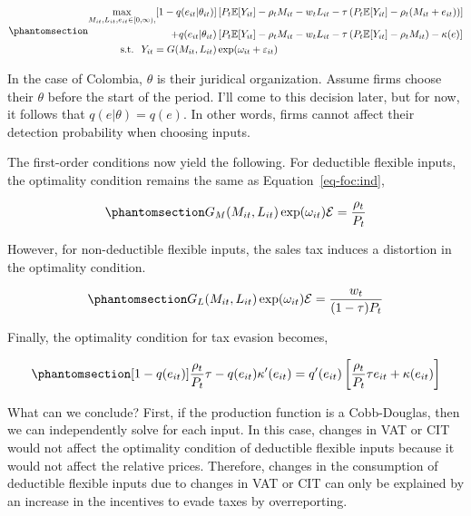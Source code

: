 \documentclass[
  12pt]{article}
\theoremstyle{definition}
\theoremstyle{remark}
\begin{document}
\begin{equation}\phantomsection\label{eq-eva-non-deduct}{
\begin{aligned}
  \max_{M_{it}, L_{it},e_{it}\in [0,\infty), } [1-q(e_{it}|\theta_{it})]&\left[P_t\mathbb{E}[Y_{it}]-\rho_{t} M_{it}-w_{t} L_{it}-\tau\left(P_t\mathbb{E}[Y_{it}]-\rho_{t} (M_{it}+e_{it})\right)\right]\\
  +q(e_{it}|\theta_{it})&\left[P_t\mathbb{E}[Y_{it}]-\rho_{t} M_{it}-w_{t} L_{it}-\tau\left(P_t\mathbb{E}[Y_{it}]-\rho_{t} M_{it}\right)-\kappa(e)\right] \\
  \text{s.t. }\; Y_{it}=G(M_{it},L_{it})&\exp(\omega_{it}+\varepsilon_{it})
\end{aligned}
}\end{equation}

In the case of Colombia, \(\theta\) is their juridical organization.
Assume firms choose their \(\theta\) before the start of the period.
I'll come to this decision later, but for now, it follows that
\(q(e|\theta)=q(e)\). In other words, firms cannot affect their
detection probability when choosing inputs.

The first-order conditions now yield the following. For deductible
flexible inputs, the optimality condition remains the same as
Equation~\ref{eq-foc:ind},

\begin{equation}\phantomsection\label{eq-foc:deduct}{
G_M(M_{it}, L_{it})\exp(\omega_{it})\mathcal{E}=\frac{\rho_{t}}{P_t}
}\end{equation}

However, for non-deductible flexible inputs, the sales tax induces a
distortion in the optimality condition.

\begin{equation}\phantomsection\label{eq-foc:non-deduct}{
G_L(M_{it}, L_{it})\exp(\omega_{it})\mathcal{E}=\frac{w_{t}}{(1-\tau)P_t}
}\end{equation}

Finally, the optimality condition for tax evasion becomes,

\begin{equation}\phantomsection\label{eq-foc-cont-e}{
[1-q(e_{it})]\frac{\rho_t}{P_t}\tau-q(e_{it})\kappa'(e_{it})=q'(e_{it})\left[\frac{\rho_t}{P_t}\tau e_{it} + \kappa(e_{it})\right]
}\end{equation}

What can we conclude? First, if the production function is a
Cobb-Douglas, then we can independently solve for each input. In this
case, changes in VAT or CIT would not affect the optimality condition of
deductible flexible inputs because it would not affect the relative
prices. Therefore, changes in the consumption of deductible flexible
inputs due to changes in VAT or CIT can only be explained by an increase
in the incentives to evade taxes by overreporting.
\end{document}
